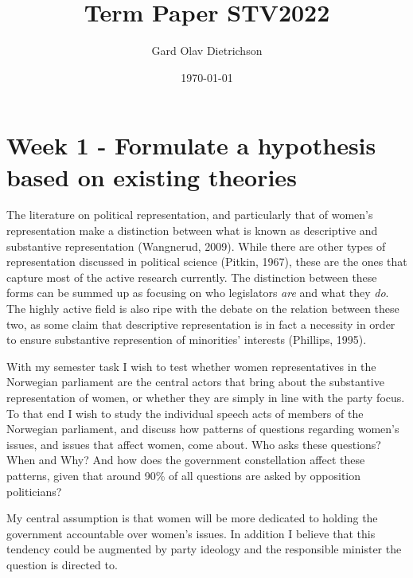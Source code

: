 \documentclass[12pt]{article}
\title{Term Paper STV2022}
\author{Gard Olav Dietrichson}
\date{\today}
\begin{document}
	\maketitle
	
	\section{Week 1 - Formulate a hypothesis based on existing theories}
	The literature on political representation, and particularly that of women's representation make a distinction between what is known as descriptive and substantive representation (Wangnerud, 2009). While there are other types of representation discussed in political science (Pitkin, 1967), these are the ones that capture most of the active research currently. The distinction between these forms can be summed up as focusing on who legislators \textit{are} and what they \textit{do}. The highly active field is also ripe with the debate on the relation between these two, as some claim that descriptive representation is in fact a necessity in order to ensure substantive represention of minorities' interests (Phillips, 1995).
	
	With my semester task I wish to test whether women representatives in the Norwegian parliament are the central actors that bring about the substantive representation of women, or whether they are simply in line with the party focus. To that end I wish to study the individual speech acts of members of the Norwegian parliament, and discuss how patterns of questions regarding women's issues, and issues that affect women, come about. Who asks these questions? When and Why? And how does the government constellation affect these patterns, given that around 90\% of all questions are asked by opposition politicians?
	
	My central assumption is that women will be more dedicated to holding the government accountable over women's issues. In addition I believe that this tendency could be augmented by party ideology and the responsible minister the question is directed to. 
	
\end{document}
